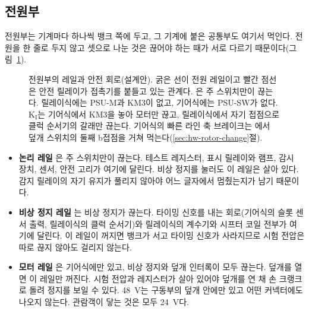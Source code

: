 \subsection{전원부}\label{sec:hw-power}

전원부는 기계마다 하나씩 뱅크 쪽에 두고, 그 기계에 붙은 공통부도 여기서 먹인다. 전원을 한 줄로 두지 않고 셋으로
나눈 것은 끊어야 하는 때가 서로 다르기 때문이다(그림~\ref{fig:hw-power-unit}).

\begin{figure}[ht]
\centering

\caption{전원부의 레일과 안전 회로(설계안). 굵은 선이 전원 레일이고 빨간 점선은 안전 릴레이가 접촉기를 붙들고
있는 관계다. 은 주 스위치만이 끊는다. 릴레이식에는 PSU-M과 KM3이 없고, 기어식에는 PSU-SW가 없다.
K$_\mathrm{I}$는 기어식에서 KM3을 놓아 모터만 끊고, 릴레이식에서 자기 접점으로 클럭 순서기의 갈래만 끊는다. 기어식의
빠른 라인 축 브레이크는 에서 덮개 스위치의 둘째 b접점을 거쳐 먹는다(\ref{sec:hw-rotor-change}절).}
\label{fig:hw-power-unit}
\end{figure}

\begin{itemize}
\item \textbf{논리 레일 }은 주 스위치만이 끊는다. 테스트 레지스터, 표시 릴레이와 램프, 감시 장치,
센서, 안전 고리가 여기에 달린다. 비상 정지를 눌러도 이 레일은 살아 있다. 감지 릴레이의 자기 유지가 풀리지 않아야
어느 글자에서 멈췄는지가 남기 때문이다.
\item \textbf{비상 정지 레일 }는 비상 정지가 끊는다. 타이밍 신호를 내는 회로(기어식의 슬롯 센서
출력, 릴레이식의 클럭 순서기)와 릴레이식의 계수기와 시프터 코일 전부가 여기에 달린다. 이 레일이 꺼지면 뱅크가
서고 타이밍 신호가 사라지므로 시험 전압은 따로 끊지 않아도 걸리지 않는다.
\item \textbf{모터 레일 }은 기어식에만 있고, 비상 정지와 덮개 인터록이 모두 끊는다. 덮개를 열면
이 레일만 꺼진다. 시험 전압과 레지스터가 살아 있어야 덮개를 연 채 손 크랭크로 돌려 정지를 보일 수 있다. 48~V는
구동부의 덮개 안에만 있고 어떤 커넥터에도 나오지 않는다. 관람객이 닿는 것은 모두 24~V다.
\end{itemize}

